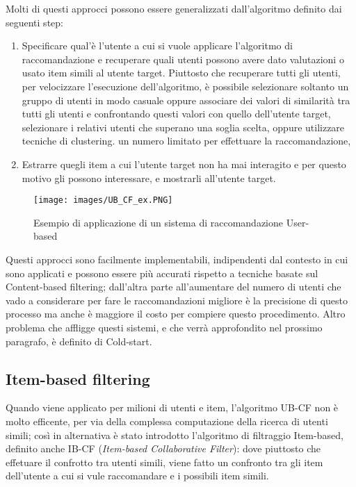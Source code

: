 Molti di questi approcci possono essere generalizzati dall'algoritmo definito dai seguenti step:
\begin{enumerate}
	\item Specificare qual'è l'utente a cui si vuole applicare l'algoritmo di raccomandazione e recuperare quali utenti possono 
	avere dato valutazioni o usato item simili al utente target. Piuttosto che recuperare tutti gli utenti, per velocizzare l'esecuzione
	dell'algoritmo, è possibile selezionare soltanto un gruppo di utenti in modo casuale oppure associare dei valori di similarità tra 
	tutti gli utenti e confrontando questi valori con quello dell'utente target, selezionare i relativi utenti che superano una soglia
	scelta, oppure utilizzare tecniche di clustering. 
	un numero limitato per effettuare la raccomandazione, 
	\item Estrarre quegli item a cui l'utente target non ha mai interagito e per questo motivo gli possono interessare, e mostrarli 
	all'utente target.
\end{enumerate}

\begin{figure}[ht!]
	\centering
	\texttt{[image: images/UB\_CF\_ex.PNG]}
	\caption{Esempio di applicazione di un sistema di raccomandazione User-based}
	\label{fig:UB_CF}
\end{figure}

Questi approcci sono facilmente implementabili, indipendenti dal contesto in cui sono applicati e possono essere più accurati rispetto
a tecniche basate sul Content-based filtering; dall'altra parte all'aumentare del numero di utenti che vado a considerare per fare le 
raccomandazioni migliore è la precisione di questo processo ma anche è maggiore il costo per compiere questo procedimento. Altro 
problema che affligge questi sistemi, e che verrà approfondito nel prossimo paragrafo, è definito di Cold-start. 

\subsection{Item-based filtering} 


Quando viene applicato per milioni di utenti e item, l'algoritmo UB-CF non è molto efficente, per via della complessa computazione della 
ricerca di utenti simili; così in alternativa è stato introdotto l'algoritmo di filtraggio Item-based, definito anche IB-CF 
(\textit{Item-based Collaborative Filter}): dove piuttosto che effetuare il confrotto tra utenti simili, viene fatto un confronto tra 
gli item dell'utente a cui si vule raccomandare e i possibili item simili.

